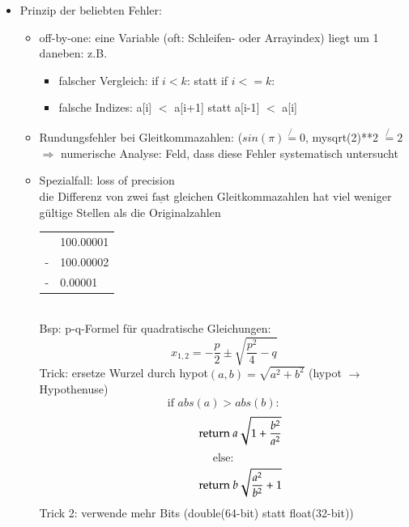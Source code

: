 \documentclass[11pt, fleqn]{scrreprt}
\begin{document}
\begin{itemize}
            \item Prinzip der \glqq beliebten Fehler\grqq:
            \begin{itemize}
            \item off-by-one: eine Variable (oft: Schleifen- oder Arrayindex) liegt um 1 daneben: z.B.
            \begin{itemize}
            \item falscher Vergleich: if $i<k$: statt if $i <= k$:
            \item falsche Indizes: a[i] $<$ a[i+1] statt a[i-1] $<$ a[i]
            \end{itemize}
            \item Rundungsfehler bei Gleitkommazahlen: ($sin(\pi)\not{=} 0$, mysqrt(2)**2 $\not{=} 2$\\
            $\Rightarrow$ numerische Analyse: Feld, dass diese Fehler systematisch untersucht
            \item Spezialfall: loss of precision \\
            die Differenz von zwei $\underline{\text{fast}}$ gleichen Gleitkommazahlen hat viel weniger gültige Stellen als die Originalzahlen \\
            \begin{tabular}{L{0.5cm} R{2cm}}
            & 100.00001 \\
            - & 100.00002 \\ \hline
            - & 0.00001 \\
            \end{tabular}\\

            Bsp: p-q-Formel für quadratische Gleichungen:
            \[x_{1,2} = -\frac{p}{2} \pm \sqrt{\frac{p^2}{4} - q} \]
            Trick: ersetze Wurzel durch hypot$(a,b) = \sqrt{a^2 + b^2}$ \hspace*{1cm}(hypot $\rightarrow$ Hypothenuse)\\
            \[ \text{if } abs(a) > abs(b):\]
            \[\hspace*{1cm}\text{return } a \sqrt{1 + \frac{b^2}{a^2}}\]
            \[ \text{else}:\]
            \[\hspace*{1cm}\text{return } b \sqrt{\frac{a^2}{b^2} + 1} \]
            Trick 2: verwende mehr Bits (double(64-bit) statt float(32-bit)) \\


\end{itemize}
\end{itemize}
\end{document}
